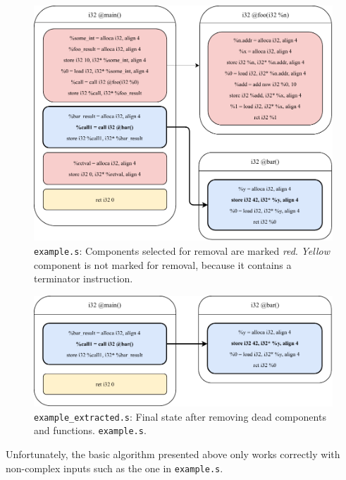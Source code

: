 \documentclass[12pt, twoside]{fithesis2}
\renewcommand{\_}{\leavevmode \kern0.07em\vbox{\hrule width0.4em}}
\begin{document}
\begin{figure}[ht]
    \centering
    \includegraphics[]{images/main_removing_prepare.pdf}
    \caption{
    \texttt{example.s}:
    Components selected for removal are marked \emph{red}.
    \emph{Yellow} component is not marked for removal, because it contains a
    terminator instruction.
    }
    \label{fig:removing_prepare}
\end{figure}

\begin{figure}[ht]
    \centering
    \includegraphics[]{images/main_removing_done.pdf}
    \caption{
    \texttt{example_extracted.s}:
    Final state after removing dead components and functions.
    \texttt{example.s}.
    }
    \label{fig:removing_done}
\end{figure}


Unfortunately, the basic algorithm presented above only works correctly with
non-complex inputs such as the one in \texttt{example.s}.
\end{document}
